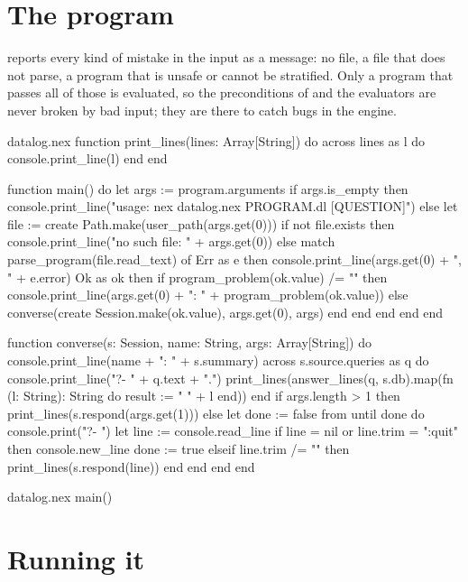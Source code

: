 \section{The program}

 reports every kind of mistake in the input as a message: no
file, a file that does not parse, a program that is unsafe or cannot be
stratified. Only a program that passes all of those is evaluated, so the
preconditions of  and the evaluators are never broken
by bad input; they are there to catch bugs in the engine.

\begin{continued}{datalog.nex}
function print_lines(lines: Array[String])
do
  across lines as l do
    console.print_line(l)
  end
end

function main()
do
  let args := program.arguments
  if args.is_empty then
    console.print_line("usage: nex datalog.nex PROGRAM.dl [QUESTION]")
  else
    let file := create Path.make(user_path(args.get(0)))
    if not file.exists then
      console.print_line("no such file: " + args.get(0))
    else
      match parse_program(file.read_text) of
        Err as e then console.print_line(args.get(0) + ", " + e.error)
        Ok as ok then
          if program_problem(ok.value) /= "" then
            console.print_line(args.get(0) + ": " + program_problem(ok.value))
          else
            converse(create Session.make(ok.value), args.get(0), args)
          end
      end
    end
  end
end

function converse(s: Session, name: String, args: Array[String])
do
  console.print_line(name + ": " + s.summary)
  across s.source.queries as q do
    console.print_line("?- " + q.text + ".")
    print_lines(answer_lines(q, s.db).map(fn (l: String): String do
      result := "   " + l
    end))
  end
  if args.length > 1 then
    print_lines(s.respond(args.get(1)))
  else
    let done := false
    from until done do
      console.print("?- ")
      let line := console.read_line
      if line = nil or line.trim = ":quit" then
        console.new_line
        done := true
      elseif line.trim /= "" then
        print_lines(s.respond(line))
      end
    end
  end
end
\end{continued}

\begin{continued}{datalog.nex}
main()
\end{continued}

\section{Running it}

